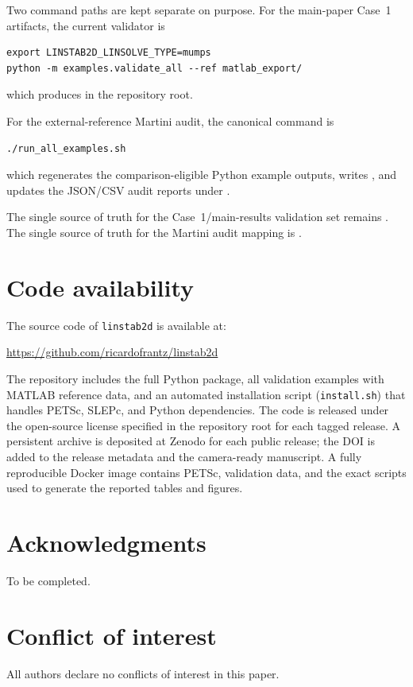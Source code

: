 \documentclass[11pt]{article}
\begin{document}
Two command paths are kept separate on purpose.
For the main-paper Case~1 artifacts, the current validator is
\begin{verbatim}
export LINSTAB2D_LINSOLVE_TYPE=mumps
python -m examples.validate_all --ref matlab_export/
\end{verbatim}
which produces  in the repository root.

For the external-reference Martini audit, the canonical command is
\begin{verbatim}
./run_all_examples.sh
\end{verbatim}
which regenerates the comparison-eligible Python example outputs, writes , and updates the JSON/CSV audit reports under .

The single source of truth for the Case~1/main-results validation set remains .
The single source of truth for the Martini audit mapping is .

\section*{Code availability}

The source code of \texttt{linstab2d} is available at:
\begin{center}
  \url{https://github.com/ricardofrantz/linstab2d}
\end{center}
The repository includes the full Python package, all validation examples with MATLAB reference data, and an automated installation script (\texttt{install.sh}) that handles PETSc, SLEPc, and Python dependencies.
The code is released under the open-source license specified in the repository root for each tagged release.
A persistent archive is deposited at Zenodo for each public release; the DOI is added to the release metadata and the camera-ready manuscript.
A fully reproducible Docker image  contains PETSc, validation data, and the exact scripts used to generate the reported tables and figures.

\section*{Acknowledgments}
To be completed.

\section*{Conflict of interest}
All authors declare no conflicts of interest in this paper.



\end{document}
